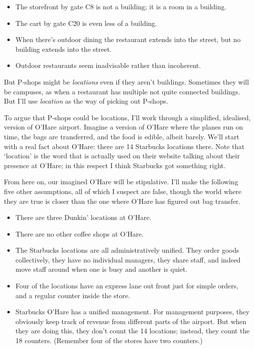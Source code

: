 \documentclass[
  11pt,
  letterpaper,
  DIV=11,
  numbers=noendperiod,
  twoside]{scrartcl}
\providecommand{\tightlist}{%
  \setlength{\itemsep}{0pt}\setlength{\parskip}{0pt}}
\begin{document}
\begin{itemize}
\tightlist
\item
  The storefront by gate C8 is not a building; it is a room in a
  building.
\item
  The cart by gate C20 is even less of a building.
\item
  When there's outdoor dining the restaurant extends into the street,
  but no building extends into the street.
\item
  Outdoor restaurants seem inadvisable rather than incoherent.
\end{itemize}

But P-shops might be \emph{locations} even if they aren't buildings.
Sometimes they will be campuses, as when a restaurant has multiple not
quite connected buildings. But I'll use \emph{location} as the way of
picking out P-shops.

To argue that P-shops could be locations, I'll work through a
simplified, idealised, version of O'Hare airport. Imagine a version of
O'Hare where the planes run on time, the bags are transferred, and the
food is edible, albeit barely. We'll start with a real fact about
O'Hare: there are 14 Starbucks locations there. Note that `location' is
the word that is actually used on their website talking about their
presence at O'Hare; in this respect I think Starbucks got something
right.

From here on, our imagined O'Hare will be stipulative. I'll make the
following five other assumptions, all of which I suspect are false,
though the world where they are true is closer than the one where O'Hare
has figured out bag transfer.

\begin{itemize}
\tightlist
\item
  There are three Dunkin' locations at O'Hare.
\item
  There are no other coffee shops at O'Hare.
\item
  The Starbucks locations are all administratively unified. They order
  goods collectively, they have no individual managers, they share
  staff, and indeed move staff around when one is busy and another is
  quiet.
\item
  Four of the locations have an express lane out front just for simple
  orders, and a regular counter inside the store.
\item
  Starbucks O'Hare has a unified management. For management purposes,
  they obviously keep track of revenue from different parts of the
  airport. But when they are doing this, they don't count the 14
  locations; instead, they count the 18 counters. (Remember four of the
  stores have two counters.)
\end{itemize}
\end{document}
